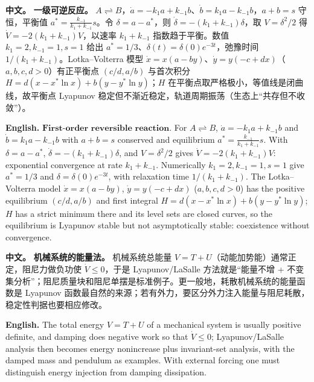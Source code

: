 \documentclass[UTF8,11pt,a4paper]{ctexart}
\newcommand{\APS}[2]{\par\noindent\textbf{中文。} #1\par\noindent\textbf{English.} #2\par}
\begin{document}
\APS{\textbf{一级可逆反应。} $A\rightleftharpoons B$，$\dot a=-k_1a+k_{-1}b$、$\dot b=k_1a-k_{-1}b$，$a+b=s$ 守恒，平衡值 $a^*=\frac{k_{-1}}{k_1+k_{-1}}s$。令 $\delta=a-a^*$，则 $\dot\delta=-(k_1+k_{-1})\delta$，取 $V=\delta^2/2$ 得 $\dot V=-2(k_1+k_{-1})V$，以速率 $k_1+k_{-1}$ 指数趋于平衡。数值 $k_1=2,k_{-1}=1,s=1$ 给出 $a^*=1/3$、$\delta(t)=\delta(0)e^{-3t}$，弛豫时间 $1/(k_1+k_{-1})$。Lotka--Volterra 模型 $\dot x=x(a-by)$、$\dot y=y(-c+dx)$（$a,b,c,d>0$）有正平衡点 $(c/d,a/b)$ 与首次积分 $H=d(x-x^*\ln x)+b(y-y^*\ln y)$；$H$ 在平衡点取严格极小，等值线是闭曲线，故平衡点 Lyapunov 稳定但不渐近稳定，轨道周期振荡（生态上“共存但不收敛”）。}{$\textbf{First-order reversible reaction.}$ For $A\rightleftharpoons B$, $\dot a=-k_1a+k_{-1}b$ and $\dot b=k_1a-k_{-1}b$ with $a+b=s$ conserved and equilibrium $a^*=\frac{k_{-1}}{k_1+k_{-1}}s$. With $\delta=a-a^*$, $\dot\delta=-(k_1+k_{-1})\delta$, and $V=\delta^2/2$ gives $\dot V=-2(k_1+k_{-1})V$: exponential convergence at rate $k_1+k_{-1}$. Numerically $k_1=2,k_{-1}=1,s=1$ give $a^*=1/3$ and $\delta=\delta(0)e^{-3t}$, with relaxation time $1/(k_1+k_{-1})$. The Lotka--Volterra model $\dot x=x(a-by)$, $\dot y=y(-c+dx)$ ($a,b,c,d>0$) has the positive equilibrium $(c/d,a/b)$ and first integral $H=d(x-x^*\ln x)+b(y-y^*\ln y)$; $H$ has a strict minimum there and its level sets are closed curves, so the equilibrium is Lyapunov stable but not asymptotically stable: coexistence without convergence.}

\APS{\textbf{机械系统的能量法。} 机械系统总能量 $V=T+U$（动能加势能）通常正定，阻尼力做负功使 $\dot V\le0$，于是 Lyapunov/LaSalle 方法就是“能量不增 + 不变集分析”；阻尼质量块和阻尼单摆是标准例子。更一般地，耗散机械系统的能量函数是 Lyapunov 函数最自然的来源；若有外力，要区分外力注入能量与阻尼耗散，稳定性判据也要相应修改。}{The total energy $V=T+U$ of a mechanical system is usually positive definite, and damping does negative work so that $\dot V\le0$; Lyapunov/LaSalle analysis then becomes energy nonincrease plus invariant-set analysis, with the damped mass and pendulum as examples. With external forcing one must distinguish energy injection from damping dissipation.}
\end{document}
